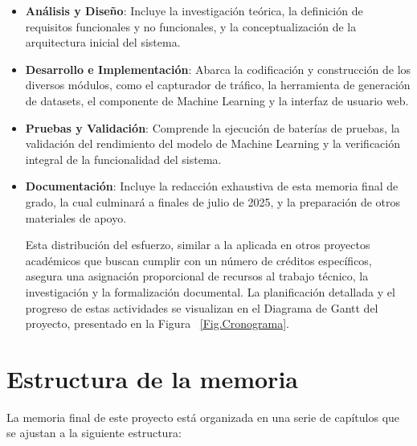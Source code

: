 \begin{itemize}

    \item\textbf{Análisis y Diseño}: Incluye la investigación teórica, la definición de requisitos funcionales y no funcionales, y la conceptualización de la arquitectura inicial del sistema.
    
    \item\textbf{Desarrollo e Implementación}: Abarca la codificación y construcción de los diversos módulos, como el capturador de tráfico, la herramienta de generación de datasets, el componente de Machine Learning y la interfaz de usuario web.
    
    \item\textbf{Pruebas y Validación}: Comprende la ejecución de baterías de pruebas, la validación del rendimiento del modelo de Machine Learning y la verificación integral de la funcionalidad del sistema.
    
    \item\textbf{Documentación}: Incluye la redacción exhaustiva de esta memoria final de grado, la cual culminará a finales de julio de 2025, y la preparación de otros materiales de apoyo.
    
    Esta distribución del esfuerzo, similar a la aplicada en otros proyectos académicos que buscan cumplir con un número de créditos específicos, asegura una asignación proporcional de recursos al trabajo técnico, la investigación y la formalización documental. La planificación detallada y el progreso de estas actividades se visualizan en el Diagrama de Gantt del proyecto, presentado en la Figura ~\ref{Fig.Cronograma}.


\end{itemize}
\section{Estructura de la memoria}
La memoria final de este proyecto está organizada en una serie de capítulos que se ajustan a la siguiente estructura:

